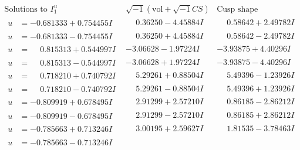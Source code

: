 \documentclass[1p]{elsarticle_modified}
\theoremstyle{definition}
\newcommand{\I}{\sqrt{-1}}
\begin{document}
$$\begin{array}{c|c|c}  
\text{Solutions to }I^u_{1}& \I (\text{vol} + \sqrt{-1}CS) & \text{Cusp shape}\\
 \hline 
\begin{aligned}
u &= -0.681333 + 0.754455 I\end{aligned}
 & \phantom{-}0.36250 - 4.45884 I & \phantom{-}0.58642 + 2.49782 I \\ \hline\begin{aligned}
u &= -0.681333 - 0.754455 I\end{aligned}
 & \phantom{-}0.36250 + 4.45884 I & \phantom{-}0.58642 - 2.49782 I \\ \hline\begin{aligned}
u &= \phantom{-}0.815313 + 0.544997 I\end{aligned}
 & -3.06628 - 1.97224 I & -3.93875 + 4.40296 I \\ \hline\begin{aligned}
u &= \phantom{-}0.815313 - 0.544997 I\end{aligned}
 & -3.06628 + 1.97224 I & -3.93875 - 4.40296 I \\ \hline\begin{aligned}
u &= \phantom{-}0.718210 + 0.740792 I\end{aligned}
 & \phantom{-}5.29261 + 0.88504 I & \phantom{-}5.49396 - 1.23926 I \\ \hline\begin{aligned}
u &= \phantom{-}0.718210 - 0.740792 I\end{aligned}
 & \phantom{-}5.29261 - 0.88504 I & \phantom{-}5.49396 + 1.23926 I \\ \hline\begin{aligned}
u &= -0.809919 + 0.678495 I\end{aligned}
 & \phantom{-}2.91299 + 2.57210 I & \phantom{-}0.86185 - 2.86212 I \\ \hline\begin{aligned}
u &= -0.809919 - 0.678495 I\end{aligned}
 & \phantom{-}2.91299 - 2.57210 I & \phantom{-}0.86185 + 2.86212 I \\ \hline\begin{aligned}
u &= -0.785663 + 0.713246 I\end{aligned}
 & \phantom{-}3.00195 + 2.59627 I & \phantom{-}1.81535 - 3.78463 I \\ \hline\begin{aligned}
u &= -0.785663 - 0.713246 I\end{aligned}

\end{array}$$
\end{document}
